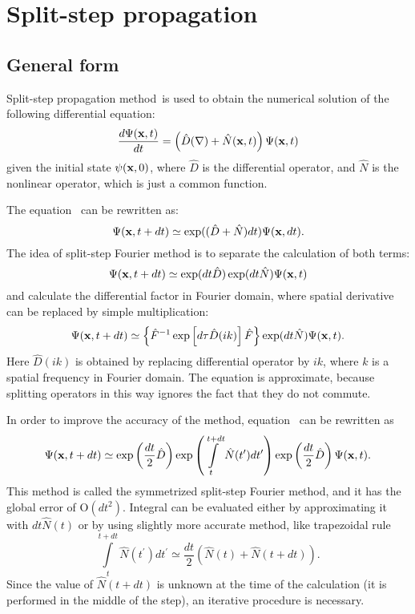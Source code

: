 \section{Split-step propagation}


\subsection{General form}

Split-step propagation method~\citationneeded is used to obtain the numerical solution of the following differential equation:
\begin{equation}
\label{eqn:split-step:general-eqn}
	\frac{d\Psi(\mathbf{x}, t)}{dt} = \left(
		\hat{D}(\nabla) + \hat{N}(\mathbf{x}, t)
	\right) \Psi(\mathbf{x}, t)
\end{equation}
given the initial state $\psi(\mathbf{x}, 0)$,
where $\hat{D}$ is the differential operator, and $\hat{N}$ is the nonlinear operator,
which is just a common function.

The equation~ can be rewritten as:
\[
	\Psi(\mathbf{x}, t + dt) \simeq \exp ( ( \hat{D} + \hat{N} ) dt ) \Psi(\mathbf{x}, dt).
\]
The idea of split-step Fourier method is to separate the calculation of both terms:
\begin{equation}
\label{eqn:split-step:split-eqn}
	\Psi(\mathbf{x}, t + dt) \simeq \exp(dt \hat{D}) \exp(dt \hat{N}) \Psi(\mathbf{x}, t)
\end{equation}
and calculate the differential factor in Fourier domain, where spatial derivative can be replaced by simple multiplication:
\[
	\Psi(\mathbf{x}, t + dt) \simeq \left\{
		\hat{F}^{-1} \exp \left[
			d\tau \hat{D}(i k)
		\right] \hat{F}
	\right\}
	\exp(dt \hat{N}) \Psi(\mathbf{x}, t).
\]
Here $\hat{D}(i k)$ is obtained by replacing differential operator by $i k$,
where $k$ is a spatial frequency in Fourier domain.
The equation is approximate, because splitting operators in this way ignores the fact that they do not commute.

In order to improve the accuracy of the method, equation~ can be rewritten as~\cite{Sinkin2003}
\[
	\Psi(\mathbf{x}, t + dt) \simeq
	\exp \left( \frac{dt}{2} \hat{D} \right)
	\exp \left( \int\limits^{t + dt}_t \hat{N} (t^\prime) dt^\prime \right)
	\exp \left( \frac{dt}{2} \hat{D} \right) \Psi(\mathbf{x}, t).
\]
This method is called the symmetrized split-step Fourier method, and it has the global error of $\mbox{O}(dt^2)$.
Integral can be evaluated either by approximating it with $dt \hat{N}(t)$ or by using slightly more accurate method,
like trapezoidal rule
\[
	\int\limits^{t + dt}_t \hat{N} (t^\prime) dt^\prime \simeq
	\frac{dt}{2} \left( \hat{N}(t) + \hat{N}(t + dt) \right).
\]
Since the value of $\hat{N}(t + dt)$ is unknown at the time of the calculation
(it is performed in the middle of the step), an iterative procedure is necessary.


